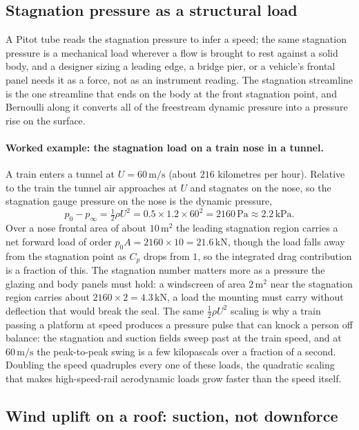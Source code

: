 \subsection{Stagnation pressure as a structural load}

A Pitot tube reads the stagnation pressure to infer a speed; the same
stagnation pressure is a mechanical load wherever a flow is brought to
rest against a solid body, and a designer sizing a leading edge, a
bridge pier, or a vehicle's frontal panel needs it as a force, not as
an instrument reading. The stagnation streamline is the one streamline
that ends on the body at the front stagnation point, and Bernoulli
along it converts all of the freestream dynamic pressure into a
pressure rise on the surface.

\paragraph{Worked example: the stagnation load on a train nose in a
tunnel.} A train enters a tunnel at $U = 60\,\si{\meter\per\second}$
(about $216$ kilometres per hour). Relative to the train the tunnel
air approaches at $U$ and stagnates on the nose, so the stagnation
gauge pressure on the nose is the dynamic pressure,
\[
p_0 - p_\infty = \tfrac12\rho U^2 = 0.5\times 1.2\times 60^2
= 2160\,\text{Pa} \approx 2.2\,\text{kPa}.
\]
Over a nose frontal area of about $10\,\si{\meter}^2$ the leading
stagnation region carries a net forward load of order $p_0 A =
2160\times 10 = 21.6\,\si{\kilo\newton}$, though the load falls away
from the stagnation point as $C_p$ drops from $1$, so the integrated
drag contribution is a fraction of this. The stagnation number matters
more as a pressure the glazing and body panels must hold: a windscreen
of area $2\,\si{\meter}^2$ near the stagnation region carries about
$2160\times 2 = 4.3\,\si{\kilo\newton}$, a load the mounting must
carry without deflection that would break the seal. The same
$\tfrac12\rho U^2$ scaling is why a train passing a platform at speed
produces a pressure pulse that can knock a person off balance: the
stagnation and suction fields sweep past at the train speed, and at
$60\,\si{\meter\per\second}$ the peak-to-peak swing is a few
kilopascals over a fraction of a second. Doubling the speed quadruples
every one of these loads, the quadratic scaling that makes
high-speed-rail aerodynamic loads grow faster than the speed itself.

\subsection{Wind uplift on a roof: suction, not downforce}


